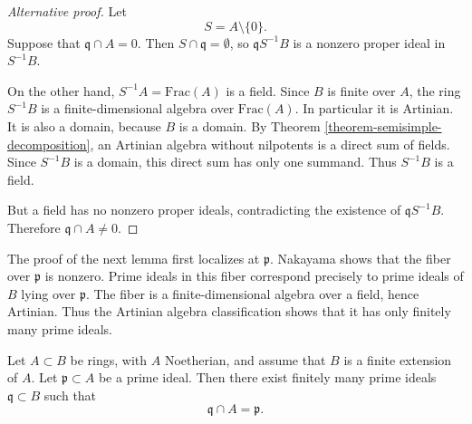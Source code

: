\begin{proof}[Alternative proof]
Let
$$
S=A\setminus \{0\}.
$$
Suppose that $\mathfrak{q}\cap A=0$.
Then $S\cap \mathfrak{q}=\emptyset$,
so $\mathfrak{q}S^{-1}B$ is a nonzero
proper ideal in $S^{-1}B$.

On the other hand,
$S^{-1}A=\text{Frac}(A)$ is a field.
Since $B$ is finite over $A$,
the ring $S^{-1}B$ is a finite-dimensional
algebra over $\text{Frac}(A)$.
In particular it is Artinian.
It is also a domain, because $B$ is a
domain.
By Theorem
\ref{theorem-semisimple-decomposition},
an Artinian algebra without nilpotents
is a direct sum of fields.
Since $S^{-1}B$ is a domain, this direct
sum has only one summand.
Thus $S^{-1}B$ is a field.

But a field has no nonzero proper ideals,
contradicting the existence of
$\mathfrak{q}S^{-1}B$.
Therefore $\mathfrak{q}\cap A\neq 0$.
\end{proof}

\noindent
The proof of the next lemma first localizes
at $\mathfrak{p}$.
Nakayama shows that the fiber over
$\mathfrak{p}$ is nonzero.
Prime ideals in this fiber correspond
precisely to prime ideals of $B$ lying over
$\mathfrak{p}$.
The fiber is a finite-dimensional algebra
over a field, hence Artinian.
Thus the Artinian algebra classification
shows that it has only finitely many prime
ideals.

\begin{lemma}[Going up]
\label{lemma-going-up}
Let $A\subset B$ be rings, with $A$
Noetherian, and assume that $B$ is a
finite extension of $A$.
Let $\mathfrak{p}\subset A$ be a prime
ideal.
Then there exist finitely many prime ideals
$\mathfrak{q}\subset B$ such that
$$
\mathfrak{q}\cap A=\mathfrak{p}.
$$
\end{lemma}

